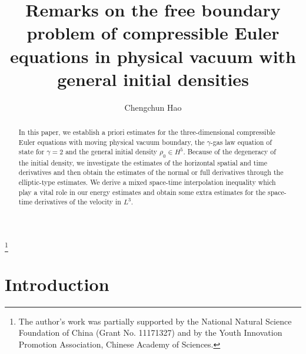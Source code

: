 \documentclass[12pt,twoside,reqno]{amsart}
\numberwithin{equation}{section}
\theoremstyle{definition}
\theoremstyle{remark}
\begin{document}
\title[FREE-BOUNDARY COMPRESSIBLE EULER SYSTEM IN VACUUM]{Remarks on the free boundary problem of compressible Euler equations in physical vacuum with general initial densities}\author{Chengchun Hao}
\address{Institute of Mathematics,
 Academy of Mathematics and Systems Science,
 and Hua Loo-Keng Key Laboratory of Mathematics,
  Chinese Academy of Sciences,
   Beijing 100190, China}
\thanks{The author's work was partially supported by the National Natural Science Foundation of China (Grant No. 11171327) and by the Youth Innovation Promotion Association, Chinese Academy of Sciences.}

\begin{abstract}
  In this paper, we establish a priori estimates for the three-dimensional compressible Euler equations with moving physical vacuum boundary, the $\gamma$-gas law equation of state for $\gamma=2$ and the general initial density ${\rho_0} \in H^5$. Because of the degeneracy of the initial density, we investigate the estimates of the horizontal spatial and time derivatives and then obtain the estimates of the normal or full derivatives through the elliptic-type estimates. We derive a mixed space-time interpolation inequality which play a vital role in our energy estimates and obtain some extra estimates for the space-time derivatives of the velocity in $L^3$.
\end{abstract}


\maketitle

\section{Introduction}
\end{document}
